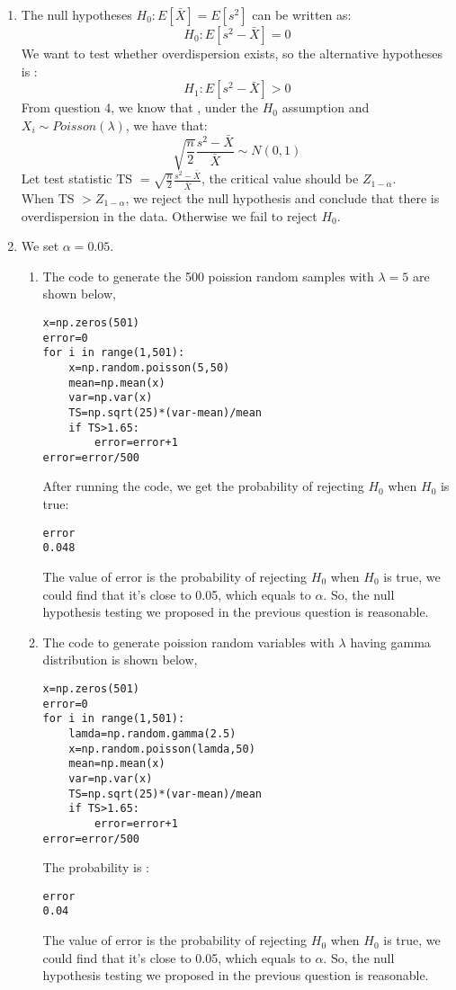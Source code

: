 \documentclass[11pt]{article}
\begin{document}
\begin{enumerate}
\item
The null hypotheses $H_0: E[\bar{X}] = E[s^2]$ can be written as:
$$H_0: E[s^2-\bar{X}] = 0$$
We want to test whether overdispersion exists, so the alternative hypotheses is :
$$H_1: E[s^2-\bar{X}] > 0$$
From question 4, we know that , under the $H_0$ assumption and $X_i \sim Poisson(\lambda)$, we have that:\\
$$\sqrt{\frac{n}{2}} \frac{s^2 - \bar{X}}{\bar{X}} \sim N(0,1)$$
Let test statistic TS $=\sqrt{\frac{n}{2}} \frac{s^2 - \bar{X}}{\bar{X}}$, the critical value should be $Z_{1-\alpha}$.\\
When TS $ > Z_{1-\alpha}$, we reject the null hypothesis and conclude that there is overdispersion in the data. Otherwise we fail to reject $H_0$.
\item
We set $\alpha=0.05$.
\begin{enumerate}
    \item The code to generate the 500 poission random samples with $\lambda=5$ are shown below, 
\begin{lstlisting}[frame=single]
x=np.zeros(501)
error=0
for i in range(1,501):
    x=np.random.poisson(5,50)
    mean=np.mean(x)
    var=np.var(x)
    TS=np.sqrt(25)*(var-mean)/mean
    if TS>1.65:
        error=error+1
error=error/500  
\end{lstlisting}
After running the code, we get the probability of rejecting $H_0$ when $H_0$ is true:
\begin{lstlisting}[frame=single]
error
0.048
\end{lstlisting}
The value of error is the probability of rejecting $H_0$ when $H_0$ is true, we could find that it's close to 0.05, which equals to $\alpha$. So, the null hypothesis testing we proposed in the previous question is reasonable. 
\item
The code to generate poission random variables with $\lambda$ having gamma distribution is shown below, 
\begin{lstlisting}[frame=single]
x=np.zeros(501)
error=0
for i in range(1,501):
    lamda=np.random.gamma(2.5)
    x=np.random.poisson(lamda,50)
    mean=np.mean(x)
    var=np.var(x)
    TS=np.sqrt(25)*(var-mean)/mean
    if TS>1.65:
        error=error+1
error=error/500   
\end{lstlisting}
The probability is :
\begin{lstlisting}[frame=single]
error
0.04
\end{lstlisting}
The value of error is the probability of rejecting $H_0$ when $H_0$ is true, we could find that it's close to 0.05, which equals to $\alpha$. So, the null hypothesis testing we proposed in the previous question is reasonable. 

\end{enumerate}
\end{enumerate}
\end{document}
